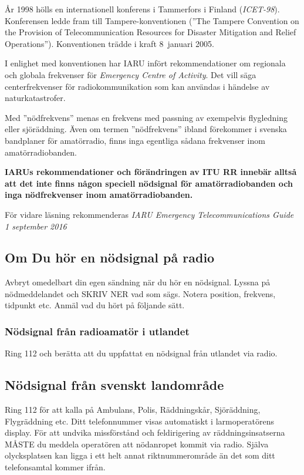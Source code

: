 År 1998 hölls en internationell konferens i Tammerfors i Finland (\emph{ICET-98}).
Konferensen ledde fram till Tampere-konventionen (''The Tampere Convention on
the Provision of Telecommunication Resources for Disaster Mitigation and Relief
Operations''). Konventionen trädde i kraft 8~januari 2005.

I enlighet med konventionen har IARU infört rekommendationer om regionala och globala frekvenser för \emph{Emergency Centre of Activity}.
Det vill säga centerfrekvenser för radiokommunikation som kan användas i händelse av naturkatastrofer.

Med ''nödfrekvens'' menas en frekvens med passning av exempelvis flygledning eller sjöräddning. Även om termen ''nödfrekvens'' ibland förekommer i svenska bandplaner för amatörradio, finns inga egentliga sådana frekvenser inom amatörradiobanden.

\textbf{IARUs rekommendationer och förändringen av ITU RR innebär alltså att det inte
	finns någon speciell nödsignal för amatörradiobanden och inga nödfrekvenser
	inom amatörradiobanden.}

För vidare läsning rekommenderas
\emph{IARU Emergency Telecommunications Guide 1 september 2016}

\subsection{Om Du hör en nödsignal på radio}

Avbryt omedelbart din egen sändning när du hör en nödsignal. Lyssna på
nödmeddelandet och SKRIV NER vad som sägs. Notera position, frekvens, tidpunkt
etc. Anmäl vad du hört på följande sätt.

\subsubsection{Nödsignal från radioamatör i utlandet}

Ring 112 och berätta att du uppfattat en nödsignal från utlandet via radio.

\subsection{Nödsignal från svenskt landområde}

Ring 112 för att kalla på Ambulans, Polis, Räddningskår, Sjöräddning,
Flygräddning etc. Ditt telefonnummer visas automatiskt i larmoperatörens
display. För att undvika missförstånd och feldirigering av
räddningsinsatserna MÅSTE du meddela operatören att nödanropet kommit via radio.
Själva olycksplatsen kan ligga i ett helt annat riktnummerområde än det som ditt
telefonsamtal kommer ifrån.

